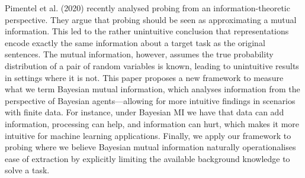 Pimentel et al. (2020) recently analysed probing from an information-theoretic perspective. They argue that probing should be seen as approximating a mutual information. This led to the rather unintuitive conclusion that representations encode exactly the same information about a target task as the original sentences. The mutual information, however, assumes the true probability distribution of a pair of random variables is known, leading to unintuitive results in settings where it is not. This paper proposes a new framework to measure what we term Bayesian mutual information, which analyses information from the perspective of Bayesian agents---allowing for more intuitive findings in scenarios with finite data. For instance, under Bayesian MI we have that data can add information, processing can help, and information can hurt, which makes it more intuitive for machine learning applications. Finally, we apply our framework to probing where we believe Bayesian mutual information naturally operationalises ease of extraction by explicitly limiting the available background knowledge to solve a task.
